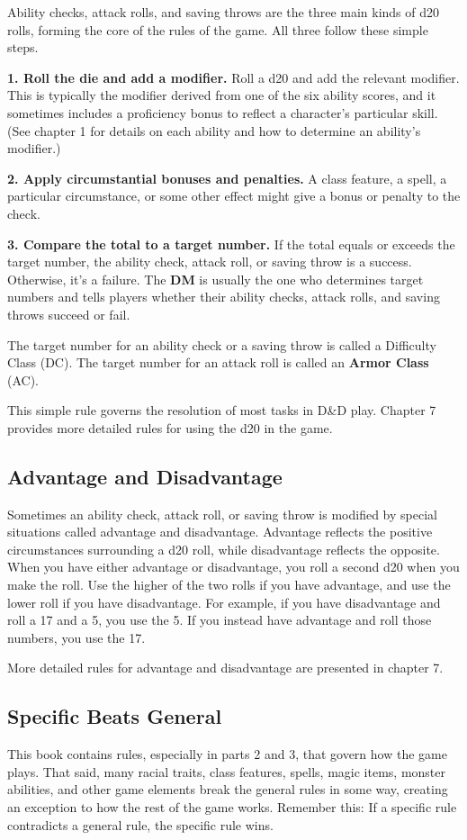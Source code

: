 Ability checks, attack rolls, and saving throws are the three main kinds of d20 rolls, forming the core of the rules of the game. All three follow these simple steps.

\textbf{1. Roll the die and add a modifier.} Roll a d20 and add the relevant modifier. This is typically the modifier derived from one of the six ability scores, and it sometimes includes a proficiency bonus to reflect a character’s particular skill. (See chapter 1 for details on each ability and how to determine an ability’s modifier.)

\textbf{2. Apply circumstantial bonuses and penalties.} A class feature, a spell, a particular circumstance, or some other effect might give a bonus or penalty to the check.

\textbf{3. Compare the total to a target number.} If the total equals or exceeds the target number, the ability check, attack roll, or saving throw is a success. Otherwise, it’s a failure. The \textbf{DM} is usually the one who determines target numbers and tells players whether their ability checks, attack rolls, and saving throws succeed or fail.

The target number for an ability check or a saving throw is called a Difficulty Class (DC). The target number for an attack roll is called an \textbf{Armor Class} (AC).

This simple rule governs the resolution of most tasks in D\&D play. Chapter 7 provides more detailed rules for using the d20 in the game.

\subsection{Advantage and Disadvantage}
Sometimes an ability check, attack roll, or saving throw is modified by special situations called advantage and disadvantage. Advantage reflects the positive circumstances surrounding a d20 roll, while disadvantage reflects the opposite. When you have either advantage or disadvantage, you roll a second d20 when you make the roll. Use the higher of the two rolls if you have advantage, and use the lower roll if you have disadvantage. For example, if you have disadvantage and roll a 17 and a 5, you use the 5. If you instead have advantage and roll those numbers, you use the 17.

More detailed rules for advantage and disadvantage are presented in chapter 7.

\subsection{Specific Beats General}
This book contains rules, especially in parts 2 and 3, that govern how the game plays. That said, many racial traits, class features, spells, magic items, monster abilities, and other game elements break the general rules in some way, creating an exception to how the rest of the game works. Remember this: If a specific rule contradicts a general rule, the specific rule wins.

